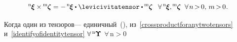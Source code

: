 \begin{otherlanguage}{russian}
\nopagebreak\vspace{-0.2em}\begin{equation}\label{crossproductforanytwotensors}
{^\mathrm{n}\hspace{-0.12ex}\bm{\xi}} \times \hspace{-0.12ex} {^\mathrm{m}\hspace{-0.12ex}\bm{\zeta}}
=
- \hspace{.25ex} {^\mathrm{n}\hspace{-0.12ex}\bm{\xi}} \dotp \levicivitatensor \dotp \hspace{-0.1ex} {^\mathrm{m}\hspace{-0.12ex}\bm{\zeta}}
\;\;\:
%
\forall \hspace{.4ex} {^\mathrm{n}\hspace{-0.12ex}\bm{\xi}} ,
\hspace{-0.12ex} {^\mathrm{m}\hspace{-0.12ex}\bm{\zeta}}
\;\;
\forall \hspace{.25ex} n \hspace{-0.25ex} > \hspace{-0.25ex} 0 , \,
m \hspace{-0.25ex} > \hspace{-0.25ex} 0
\hspace{.1ex} .
\end{equation}

\vspace{-0.1em}\noindent
Когда один из тензоров\:--- единичный~(), из~\eqref{crossproductforanytwotensors} и~\eqref{identifyofidentitytensor} ${\forall \, {^\mathrm{n}\hspace{-0.12ex}\bm{\Upsilon}}}$ ${\forall \,\mathrm{n \!>\! 0}}$


\end{otherlanguage}
